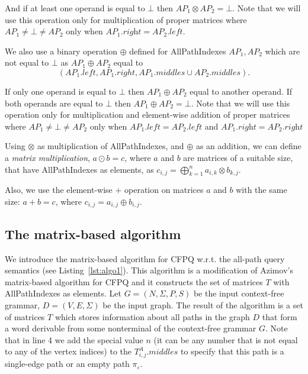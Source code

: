 And if at least one operand is equal to $\bot$ then $AP_1 \otimes AP_2 = \bot$. Note that we will use this operation only for multiplication of proper matrices where $AP_1 \neq \bot \neq AP_2$ only when $AP_1.\textit{right} = AP_2.\textit{left}$.

We also use a binary operation $\oplus$ defined for AllPathIndexes \mbox{$AP_1, AP_2$} which are not equal to $\bot$ as $AP_1 \oplus AP_2$ equal to
	$$(AP_1.left, AP_1.right, AP_1.middles \cup AP_2.middles).$$
	
If only one operand is equal to $\bot$ then $AP_1 \oplus AP_2$ equal to another operand. If both operands are equal to $\bot$ then $AP_1 \oplus AP_2 = \bot$. Note that we will use this operation only for multiplication and element-wise addition of proper matrices where $AP_1 \neq \bot \neq AP_2$ only when $AP_1.\textit{left} = AP_2.\textit{left}$ and $AP_1.\textit{right} = AP_2.\textit{right}$

Using $\otimes$ as multiplication of AllPathIndexes, and $\oplus$ as an addition, we can define a \emph{matrix multiplication}, \mbox{$a \odot b = c$}, where $a$ and $b$ are matrices of a suitable size, that have AllPathIndexes as elements, as $c_{i,j} = \bigoplus^{n}_{k=1}{a_{i,k} \otimes b_{k,j}}.$

Also, we use the element-wise $+$ operation on matrices $a$ and $b$ with the same size: \mbox{$a + b = c$}, where $c_{i,j} = a_{i,j} \oplus b_{i,j}.$


\subsection{The matrix-based algorithm}
We introduce the matrix-based algorithm for CFPQ w.r.t. the all-path query semantics (see Listing~\ref{lst:algo1}). This algorithm is a modification of Azimov's matrix-based algorithm for CFPQ and it constructs the set of matrices $T$ with AllPathIndexes as elements.
Let $G = (N, \Sigma, P, S)$ be the input context-free grammar, $D = (V, E, \Sigma)$ be the input graph.
The result of the algorithm is a set of matrices $T$ which stores information about all paths in the graph $D$ that form a word derivable from some nonterminal of the context-free grammar $G$. Note that in line 4 we add the special value $n$ (it can be any number that is not equal to any of the vertex indices) to the $T^{A}_{i,j}.middles$ to specify that this path is a single-edge path or an empty path $\pi_{\varepsilon}$.

